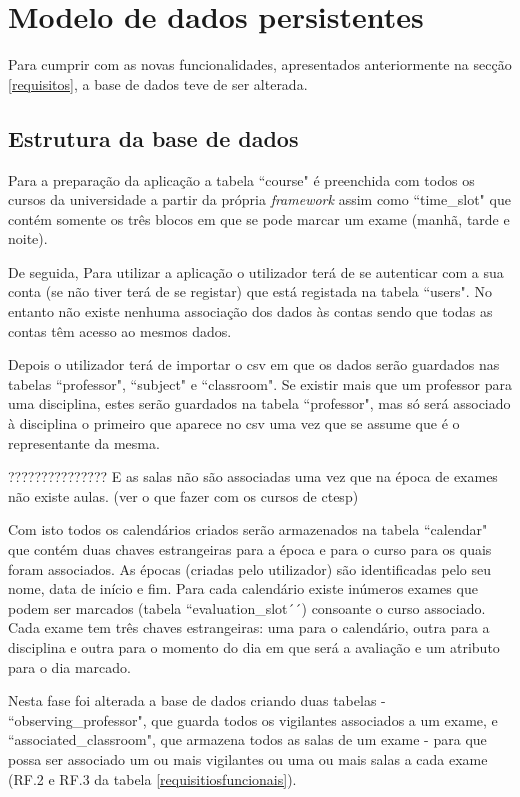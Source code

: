 \documentclass[12pt, twoside]{report}
\begin{document}
	

	
	
	\chapter{Modelo de dados persistentes}
	
		Para cumprir com as novas funcionalidades, apresentados anteriormente na secção \ref{requisitos}, a base de dados teve de ser alterada. 
	
	\section{Estrutura da base de dados}
	
	Para a preparação da aplicação a tabela ``course" é preenchida com todos os cursos da universidade a partir da própria \textit{framework} assim como ``time\_slot" que contém somente os três blocos em que se pode marcar um exame (manhã, tarde e noite).
	
	De seguida, Para utilizar a aplicação o utilizador terá de se autenticar com a sua conta (se não tiver terá de se registar) que está registada na tabela ``users". No entanto não existe nenhuma associação dos dados às contas sendo que todas as contas têm acesso ao mesmos dados.
	
	Depois o utilizador terá de importar o csv em que os dados serão guardados nas tabelas ``professor", ``subject" e ``classroom". Se existir mais que um professor para uma disciplina, estes serão guardados na tabela ``professor", mas só será associado à disciplina o primeiro que aparece no csv uma vez que se assume que é o representante da mesma.
	
	???????????????
	E as salas não são associadas uma vez que na época de exames não existe aulas. (ver o que fazer com os cursos de ctesp) 
	
	Com isto todos os calendários criados serão armazenados na tabela ``calendar" que contém duas chaves estrangeiras para a época e para o curso para os quais foram associados. As épocas (criadas pelo utilizador) são identificadas pelo seu nome, data de início e fim. Para cada calendário existe inúmeros exames que podem ser marcados (tabela ``evaluation\_slot´´) consoante o curso associado. Cada exame tem três chaves estrangeiras: uma para o calendário, outra para a disciplina e outra para o momento do dia em que será a avaliação e um atributo para o dia marcado.
	
	Nesta fase foi alterada a base de dados criando duas tabelas - ``observing\_professor", que guarda todos os vigilantes associados a um exame, e ``associated\_classroom", que armazena todos as salas de um exame - para que possa ser associado um ou mais vigilantes ou uma ou mais salas a cada exame (RF.2 e RF.3 da tabela \ref{requisitiosfuncionais}).
	
\end{document}
